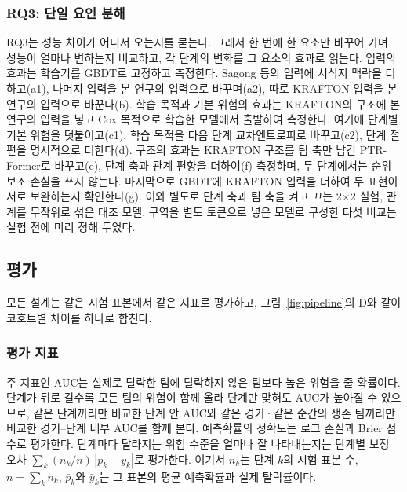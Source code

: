 \subsubsection{RQ3: 단일 요인 분해}
\label{sec:method:decomposition}
RQ3는 성능 차이가 어디서 오는지를 묻는다. 그래서 한 번에 한 요소만 바꾸어 가며 성능이 얼마나 변하는지 비교하고, 각 단계의 변화를 그 요소의 효과로 읽는다.
입력의 효과는 학습기를 GBDT로 고정하고 측정한다. Sagong 등의 입력에 서식지 맥락을 더하고(a1), 나머지 입력을 본 연구의 입력으로 바꾸며(a2), 따로 KRAFTON 입력을 본 연구의 입력으로 바꾼다(b).
학습 목적과 기본 위험의 효과는 KRAFTON의 구조에 본 연구의 입력을 넣고 Cox 목적으로 학습한 모델에서 출발하여 측정한다. 여기에 단계별 기본 위험을 덧붙이고(c1), 학습 목적을 다음 단계 교차엔트로피로 바꾸고(c2), 단계 절편을 명시적으로 더한다(d).
구조의 효과는 KRAFTON 구조를 팀 축만 남긴 PTR-Former로 바꾸고(e), 단계 축과 관계 편향을 더하여(f) 측정하며, 두 단계에서는 순위 보조 손실을 쓰지 않는다.
마지막으로 GBDT에 KRAFTON 입력을 더하여 두 표현이 서로 보완하는지 확인한다(g).
이와 별도로 단계 축과 팀 축을 켜고 끄는 2$\times$2 실험, 관계를 무작위로 섞은 대조 모델, 구역을 별도 토큰으로 넣은 모델로 구성한 다섯 비교는 실험 전에 미리 정해 두었다.

\subsection{평가}
\label{sec:method:evaluation}
모든 설계는 같은 시험 표본에서 같은 지표로 평가하고, 그림~\ref{fig:pipeline}의 D와 같이 코호트별 차이를 하나로 합친다.

\subsubsection{평가 지표}
주 지표인 AUC는 실제로 탈락한 팀에 탈락하지 않은 팀보다 높은 위험을 줄 확률이다.
단계가 뒤로 갈수록 모든 팀의 위험이 함께 올라 단계만 맞혀도 AUC가 높아질 수 있으므로, 같은 단계끼리만 비교한 단계 안 AUC와 같은 경기·같은 순간의 생존 팀끼리만 비교한 경기--단계 내부 AUC를 함께 본다.
예측확률의 정확도는 로그 손실과 Brier 점수로 평가한다.
단계마다 달라지는 위험 수준을 얼마나 잘 나타내는지는 단계별 보정 오차 $\sum_{k}(n_k/n)\,|\bar{p}_k-\bar{y}_k|$로 평가한다. 여기서 $n_k$는 단계 $k$의 시험 표본 수, $n=\sum_k n_k$, $\bar{p}_k$와 $\bar{y}_k$는 그 표본의 평균 예측확률과 실제 탈락률이다.

